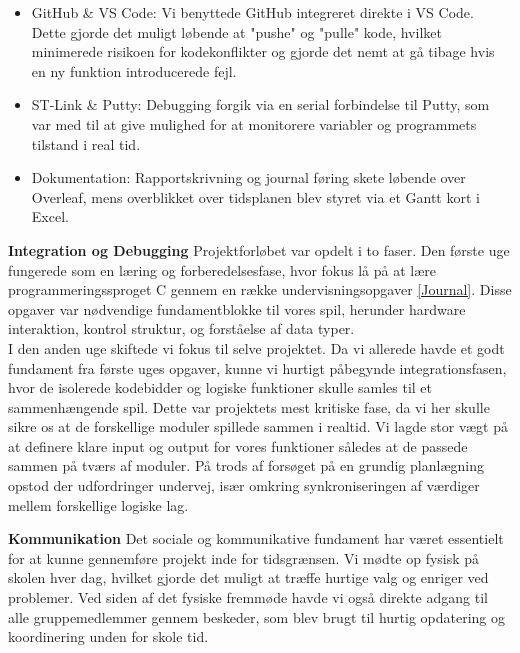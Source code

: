 \vspace{-5pt}
\begin{itemize}
    \setlength{\itemsep}{0pt}
    \setlength{\parskip}{1pt}
    \setlength{\parsep}{0pt}
    \item GitHub \& VS Code: Vi benyttede GitHub integreret direkte i VS Code. Dette gjorde det muligt løbende at "pushe" og "pulle" kode, hvilket minimerede risikoen for kodekonflikter og gjorde det nemt at gå tibage hvis en ny funktion introducerede fejl.
    \item ST-Link \& Putty: Debugging forgik via en serial forbindelse til Putty, som var med til at give mulighed for at monitorere variabler og programmets tilstand i real tid.
    \item Dokumentation: Rapportskrivning og journal føring skete løbende over Overleaf, mens overblikket over tidsplanen blev styret via et Gantt kort i Excel. 
\end{itemize}

\textbf{Integration og Debugging}
Projektforløbet var opdelt i to faser. Den første uge fungerede som en læring og forberedelsesfase, hvor fokus lå på at lære programmeringssproget C gennem en række undervisningsopgaver \ref{Journal}. Disse opgaver var nødvendige fundamentblokke til vores spil, herunder hardware interaktion, kontrol struktur, og forståelse af data typer.\\
I den anden uge skiftede vi fokus til selve projektet. Da vi allerede havde et godt fundament fra første uges opgaver, kunne vi hurtigt påbegynde integrationsfasen, hvor de isolerede kodebidder og logiske funktioner skulle samles til et sammenhængende spil. Dette var projektets mest kritiske fase, da vi her skulle sikre os at de forskellige moduler spillede sammen i realtid.
Vi lagde stor vægt på at definere klare input og output for vores funktioner således at de passede sammen på tværs af moduler. På trods af forsøget på en grundig planlægning opstod der udfordringer undervej, især omkring synkroniseringen af værdiger mellem forskellige logiske lag. 

\textbf{Kommunikation}
Det sociale og kommunikative fundament har været essentielt for at kunne gennemføre projekt inde for tidsgrænsen. Vi mødte op fysisk på skolen hver dag, hvilket gjorde det muligt at træffe hurtige valg og enriger ved problemer. Ved siden af det fysiske fremmøde havde vi også direkte adgang til alle gruppemedlemmer gennem beskeder, som blev brugt til hurtig opdatering og koordinering unden for skole tid. 

